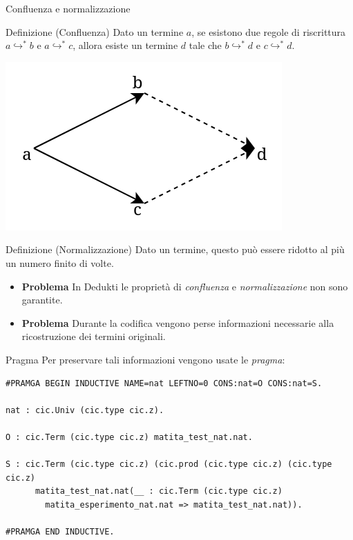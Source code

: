 \documentclass{beamer}
\begin{document}
\begin{frame}{Confluenza e normalizzazione}
  \begin{block}{Definizione (Confluenza)} 
    Dato un termine $a$, se esistono due regole di riscrittura $a \hookrightarrow^* b$ e 
    $a \hookrightarrow^*c$, allora esiste un termine $d$ tale che $b \hookrightarrow^* d$
    e $c \hookrightarrow^* d$.
  \end{block}
  \begin{center}
    \includegraphics[scale=0.40]{confluenza.png}
  \end{center}
  \begin{block}{Definizione (Normalizzazione)} 
    Dato un termine, questo può essere ridotto al più un numero finito di volte.
  \end{block}
\end{frame}

\begin{frame}
\begin{itemize}
  \item \alert{\textbf{Problema}} In Dedukti le proprietà di \textit{confluenza} e 
    \textit{normalizzazione} non sono garantite.
  \vspace{1em}
  \item \alert{\textbf{Problema}} Durante la codifica vengono perse informazioni necessarie
    alla ricostruzione dei termini originali.
\end{itemize}
\end{frame}

\begin{frame}[fragile]{Pragma}
Per preservare tali informazioni vengono usate le \textit{pragma}:
  \vspace{1em}
  \begin{lstlisting}
#PRAMGA BEGIN INDUCTIVE NAME=nat LEFTNO=0 CONS:nat=O CONS:nat=S.

nat : cic.Univ (cic.type cic.z).

O : cic.Term (cic.type cic.z) matita_test_nat.nat.
      
S : cic.Term (cic.type cic.z) (cic.prod (cic.type cic.z) (cic.type cic.z)
      matita_test_nat.nat(__ : cic.Term (cic.type cic.z)
        matita_esperimento_nat.nat => matita_test_nat.nat)).
      
#PRAMGA END INDUCTIVE.
  \end{lstlisting}
\end{frame}
\end{document}
